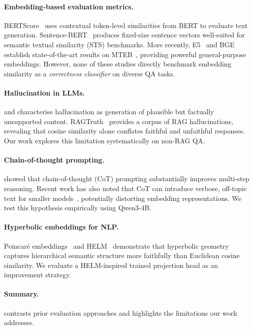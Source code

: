 \documentclass{article}
\begin{document}
\paragraph{Embedding-based evaluation metrics.}
BERTScore~\citep{zhang2019bertscore} uses contextual token-level similarities from
BERT to evaluate text generation.
Sentence-BERT~\citep{reimers2019sentencebert} produces fixed-size sentence vectors
well-suited for semantic textual similarity (STS) benchmarks.
More recently, E5~\citep{wang2022text} and BGE~\citep{xiao2023cpack} establish
state-of-the-art results on MTEB~\citep{muennighoff2022mteb}, providing powerful
general-purpose embeddings.
However, none of these studies directly benchmark embedding similarity as a
\emph{correctness classifier} on diverse QA tasks.

\paragraph{Hallucination in LLMs.}
\citet{maynez2020faithfulness} and \citet{ji2023survey} characterise hallucination
as generation of plausible but factually unsupported content.
RAGTruth~\citep{wu2023ragtruth} provides a corpus of RAG hallucinations, revealing
that cosine similarity alone conflates faithful and unfaithful responses.
Our work explores this limitation systematically on non-RAG QA.

\paragraph{Chain-of-thought prompting.}
\citet{wei2022chain} showed that chain-of-thought (CoT) prompting substantially
improves multi-step reasoning.
Recent work has also noted that CoT can introduce verbose, off-topic text for smaller
models~\citep{kojima2022large}, potentially distorting embedding representations.
We test this hypothesis empirically using Qwen3-4B.

\paragraph{Hyperbolic embeddings for NLP.}
Poincar\'{e} embeddings~\citep{nickel2017poincare} and HELM~\citep{he2025helm}
demonstrate that hyperbolic geometry captures hierarchical semantic structure more
faithfully than Euclidean cosine similarity.
We evaluate a HELM-inspired trained projection head as an improvement strategy.

\paragraph{Summary.}
 contrasts prior evaluation approaches and highlights the
limitations our work addresses.
\end{document}
